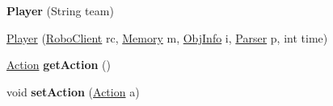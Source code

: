 \begin{DoxyCompactItemize}
\item 
\hypertarget{classPlayer_a072996becca020ca2c95b241eee356e3}{
{\bfseries Player} (String team)}
\label{classPlayer_a072996becca020ca2c95b241eee356e3}

\item 
\hyperlink{classPlayer_afe31dd3fe679bcba10385271c37ffd1a}{Player} (\hyperlink{classRoboClient}{RoboClient} rc, \hyperlink{classMemory}{Memory} m, \hyperlink{classObjInfo}{ObjInfo} i, \hyperlink{classParser}{Parser} p, int time)
\item 
\hypertarget{classPlayer_aaec2cce8cabaa09250aa111b5a189877}{
\hyperlink{classAction}{Action} {\bfseries getAction} ()}
\label{classPlayer_aaec2cce8cabaa09250aa111b5a189877}

\item 
\hypertarget{classPlayer_ae3515d6fa2bc0f9a5b1f3c754d9010f9}{
void {\bfseries setAction} (\hyperlink{classAction}{Action} a)}
\label{classPlayer_ae3515d6fa2bc0f9a5b1f3c754d9010f9}


\end{DoxyCompactItemize}
